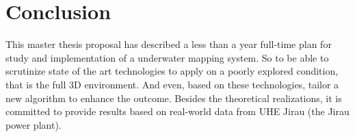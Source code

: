 \documentclass{article}
\begin{document}
\begin{landscape}

\end{landscape}
\section{Conclusion}

This master thesis proposal has described a less than a year full-time plan for
study and implementation of a underwater mapping system. So to be able to
scrutinize state of the art technologies to apply on a poorly explored
condition, that is the full 3D environment. And even, based on these
technologies, tailor a new algorithm to enhance the outcome. Besides the
theoretical realizations, it is committed to provide results based on real-world
data from UHE Jirau (the Jirau power plant).


\end{document}
